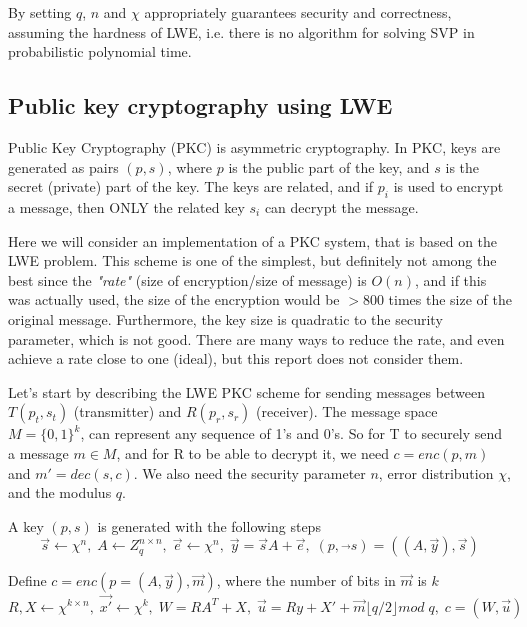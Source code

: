 \documentclass[12pt]{article}
\begin{document}
\noindent By setting $q$, $n$ and $\chi$ appropriately guarantees security and correctness, assuming the hardness of LWE, i.e. there is no algorithm for solving SVP in probabilistic polynomial time.

\subsection{Public key cryptography using LWE}
\noindent Public Key Cryptography (PKC) is asymmetric cryptography. In PKC, keys are generated as pairs $(p,s)$, where $p$ is the public part of the key, and $s$ is the secret (private) part of the key. The keys are related, and if $p_i$ is used to encrypt a message, then ONLY the related key $s_i$ can decrypt the message.

\noindent Here we will consider an implementation of a PKC system, that is based on the LWE problem. This scheme is one of the simplest, but definitely not among the best since the \emph{"rate"} (size of encryption/size of message) is $O(n)$, and if this was actually used, the size of the encryption would be $>800$ times the size of the original message. Furthermore, the key size is quadratic to the security parameter, which is not good. There are many ways to reduce the rate, and even achieve a rate close to one (ideal), but this report does not consider them.

Let's start by describing the LWE PKC scheme for sending messages between $T(p_t,s_t)$ (transmitter) and $R(p_r,s_r)$ (receiver). The message space $M = \{0,1\}^k$, can represent any sequence of 1's and 0's. So for T to securely send a message $m \in M$, and for R to be able to decrypt it, we need $c = enc(p,m)$ and $m'=dec(s,c)$. We also need the security parameter $n$, error distribution $\chi$, and the modulus $q$.


\noindent A key $(p,s)$ is generated with the following steps
\begin{equation}
    \label{eq:keygen}
    \Vec{s} \xleftarrow{} \chi^n, \;
    A \xleftarrow{} Z^{n\times n}_q, \;
    \Vec{e} \xleftarrow{} \chi^n, \;
    \Vec{y} = \Vec{s}A + \Vec{e}, \;
    (p,\Vec{}s) = ((A,\Vec{y}),\Vec{s})
\end{equation}

\noindent Define $c = enc(p=(A,\Vec{y}),\Vec{m})$, where the number of bits in $\Vec{m}$ is $k$
\begin{equation}
    \label{eq:encode}
    R,X \xleftarrow{}\chi^{k\times n}, \;
    \Vec{x'} \xleftarrow{} \chi^{k}, \;
    W = RA^T + X, \;
    \Vec{u} = Ry + X' + \Vec{m}\lfloor q/2 \rfloor mod\; q, \;
    c = (W, \Vec{u})
\end{equation}
\end{document}
